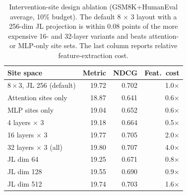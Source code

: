 \begin{table}[t]
\centering
\small
\setlength{\tabcolsep}{3pt}
\caption{Intervention-site design ablation (GSM8K+HumanEval average, 10\% budget). The default $8\,{\times}\,3$ layout with a 256-dim JL projection is within $0.08$ points of the more expensive 16- and 32-layer variants and beats attention- or MLP-only site sets. The last column reports relative feature-extraction cost.}
\label{tab:site-ablation}
\begin{tabular}{lrrr}
\toprule
Site space & Metric & NDCG & Feat.\ cost \\
\midrule
$8\times3$, JL 256 (default) & 19.72 & 0.702 & 1.0$\times$ \\
Attention sites only & 18.87 & 0.641 & 0.6$\times$ \\
MLP sites only & 19.04 & 0.652 & 0.6$\times$ \\
4 layers $\times$ 3 & 19.18 & 0.664 & 0.5$\times$ \\
16 layers $\times$ 3 & 19.77 & 0.705 & 2.0$\times$ \\
32 layers $\times$ 3 (all) & 19.80 & 0.707 & 4.0$\times$ \\
JL dim 64 & 19.25 & 0.671 & 0.8$\times$ \\
JL dim 128 & 19.55 & 0.690 & 0.9$\times$ \\
JL dim 512 & 19.74 & 0.703 & 1.6$\times$ \\
\bottomrule
\end{tabular}
\end{table}
